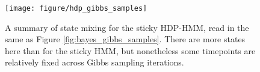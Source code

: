 \documentclass{article}
\begin{document}
\begin{figure}[ht]
  \centering
  \texttt{[image: figure/hdp\_gibbs\_samples]}
  \caption{
    A summary of state mixing for the sticky HDP-HMM, read in the same as Figure
    \ref{fig:bayes_gibbs_samples}. There are more states here than for the
    sticky HMM, but nonetheless some timepoints are relatively fixed across
    Gibbs sampling iterations.
    \label{fig:hdp_gibbs_samples} }
\end{figure}
\end{document}
